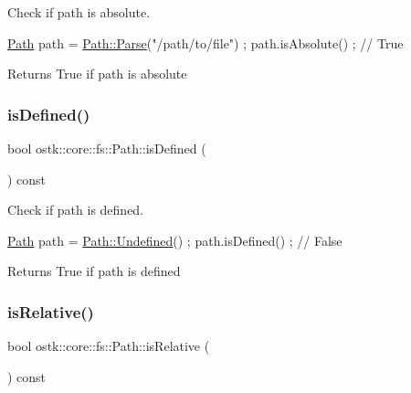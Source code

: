 Check if path is absolute. 


\begin{DoxyCode}
\hyperlink{classostk_1_1core_1_1fs_1_1_path_a1a5fff28594542489223b4cfad6cc9fb}{Path} path = \hyperlink{classostk_1_1core_1_1fs_1_1_path_ad08539ba654f5df11c4bcb07276345ad}{Path::Parse}(\textcolor{stringliteral}{"/path/to/file"}) ;
path.isAbsolute() ; \textcolor{comment}{// True}
\end{DoxyCode}


\begin{DoxyReturn}{Returns}
True if path is absolute 
\end{DoxyReturn}
\mbox{\label{classostk_1_1core_1_1fs_1_1_path_a4dc8b6e6ee6215a456bbfe0a452d3c77}} 
\subsubsection{\texorpdfstring{is\+Defined()}{isDefined()}}
{\footnotesize\ttfamily bool ostk\+::core\+::fs\+::\+Path\+::is\+Defined (\begin{DoxyParamCaption}{ }\end{DoxyParamCaption}) const}



Check if path is defined. 


\begin{DoxyCode}
\hyperlink{classostk_1_1core_1_1fs_1_1_path_a1a5fff28594542489223b4cfad6cc9fb}{Path} path = \hyperlink{classostk_1_1core_1_1fs_1_1_path_a45846b79575fae6e5a7384c06e7c000c}{Path::Undefined}() ;
path.isDefined() ; \textcolor{comment}{// False}
\end{DoxyCode}


\begin{DoxyReturn}{Returns}
True if path is defined 
\end{DoxyReturn}
\mbox{\label{classostk_1_1core_1_1fs_1_1_path_a24e2719af3a16c88930aa0a1d03625c4}} 
\subsubsection{\texorpdfstring{is\+Relative()}{isRelative()}}
{\footnotesize\ttfamily bool ostk\+::core\+::fs\+::\+Path\+::is\+Relative (\begin{DoxyParamCaption}{ }\end{DoxyParamCaption}) const}



